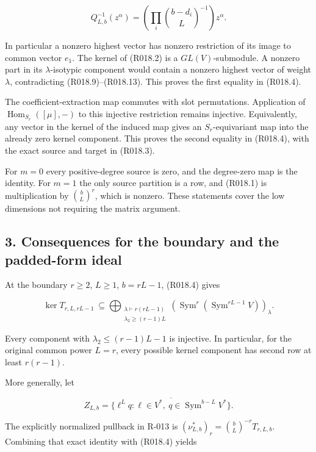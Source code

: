 \documentclass[
  10pt,
]{article}
\begin{document}
\[
Q_{L,b}^{-1}(z^\alpha)
 =\left(\prod_i\binom{b-d_i}{L}^{-1}\right)z^\alpha.
\tag{R018.13}
\]

In particular a nonzero highest vector has nonzero restriction of its
image to common vector \(e_1\). The kernel of (R018.2) is a
\(GL(V)\)-submodule. A nonzero part in its \(\lambda\)-isotypic
component would contain a nonzero highest vector of weight \(\lambda\),
contradicting (R018.9)--(R018.13). This proves the first equality in
(R018.4).

The coefficient-extraction map commutes with slot permutations.
Application of \(\operatorname{Hom}_{S_r}([\mu],-)\) to this injective
restriction remains injective. Equivalently, any vector in the kernel of
the induced map gives an \(S_r\)-equivariant map into the already zero
kernel component. This proves the second equality in (R018.4), with the
exact source and target in (R018.3).

For \(m=0\) every positive-degree source is zero, and the degree-zero
map is the identity. For \(m=1\) the only source partition is a row, and
(R018.1) is multiplication by \(\binom bL^r\), which is nonzero. These
statements cover the low dimensions not requiring the matrix argument.

\subsection{3. Consequences for the boundary and the padded-form
ideal}\label{consequences-for-the-boundary-and-the-padded-form-ideal}

At the boundary \(r\ge2\), \(L\ge1\), \(b=rL-1\), (R018.4) gives

\[
\ker T_{r,L,rL-1}
\ \subseteq\!
\bigoplus_{\substack{\lambda\vdash r(rL-1)\\
                     \lambda_2\ge(r-1)L}}
\left(\operatorname{Sym}^r(\operatorname{Sym}^{rL-1}V)\right)_\lambda.
\tag{R018.14}
\]

Every component with \(\lambda_2\le(r-1)L-1\) is injective. In
particular, for the original common power \(L=r\), every possible kernel
component has second row at least \(r(r-1)\).

More generally, let

\[
Z_{L,b}=\overline{\{\ell^Lq:
\ell\in V^*,\ q\in\operatorname{Sym}^{b-L}V^*\}}.
\]

The explicitly normalized pullback in R-013 is
\((\nu_{L,b}^*)_r=\binom bL^{-r}T_{r,L,b}\). Combining that exact
identity with (R018.4) yields
\end{document}
